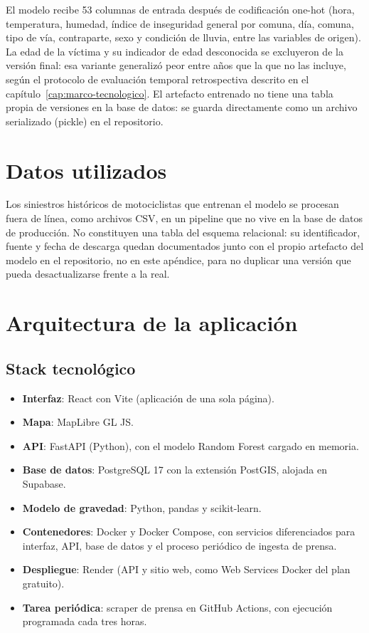 El modelo recibe 53 columnas de entrada después de codificación one-hot
(hora, temperatura, humedad, índice de inseguridad general por comuna,
día, comuna, tipo de vía, contraparte, sexo y condición de lluvia, entre
las variables de origen). La edad de la víctima y su indicador de edad
desconocida se excluyeron de la versión final: esa variante generalizó
peor entre años que la que no las incluye, según el protocolo de
evaluación temporal retrospectiva descrito en el
capítulo~\ref{cap:marco-tecnologico}. El artefacto entrenado no tiene
una tabla propia de versiones en la base de datos: se guarda
directamente como un archivo serializado (pickle) en el repositorio.

\section{Datos utilizados}

Los siniestros históricos de motociclistas que entrenan el modelo se
procesan fuera de línea, como archivos CSV, en un pipeline que no vive
en la base de datos de producción. No constituyen una tabla del esquema
relacional: su identificador, fuente y fecha de descarga quedan
documentados junto con el propio artefacto del modelo en el
repositorio, no en este apéndice, para no duplicar una versión que
pueda desactualizarse frente a la real.

\section{Arquitectura de la aplicación}

\subsection{Stack tecnológico}

\begin{itemize}
    \item \textbf{Interfaz}: React con Vite (aplicación de una sola página).
    \item \textbf{Mapa}: MapLibre GL JS.
    \item \textbf{API}: FastAPI (Python), con el modelo Random Forest cargado en memoria.
    \item \textbf{Base de datos}: PostgreSQL 17 con la extensión PostGIS, alojada en Supabase.
    \item \textbf{Modelo de gravedad}: Python, pandas y scikit-learn.
    \item \textbf{Contenedores}: Docker y Docker Compose, con servicios diferenciados para interfaz, API, base de datos y el proceso periódico de ingesta de prensa.
    \item \textbf{Despliegue}: Render (API y sitio web, como Web Services Docker del plan gratuito).
    \item \textbf{Tarea periódica}: scraper de prensa en GitHub Actions, con ejecución programada cada tres horas.
\end{itemize}

